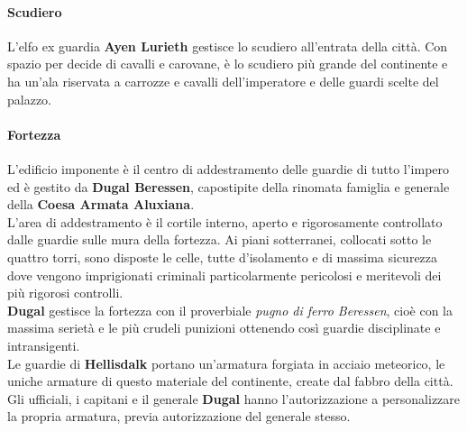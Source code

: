\documentclass[10pt,twoside,onecolumn,openany]{book}
\begin{document}
\paragraph{Scudiero}
L'elfo ex guardia \textbf{Ayen Lurieth} gestisce lo scudiero all'entrata della città. Con spazio per decide di cavalli e carovane, è lo scudiero più grande del continente e ha un'ala riservata a carrozze e cavalli dell'imperatore e delle guardi scelte del palazzo.
\paragraph{Fortezza}
L'edificio imponente è il centro di addestramento delle guardie di tutto l'impero ed è gestito da \textbf{Dugal Beressen}, capostipite della rinomata famiglia e generale della \textbf{Coesa Armata Aluxiana}.\\
L'area di addestramento è il cortile interno, aperto e rigorosamente controllato dalle guardie sulle mura della fortezza. Ai piani sotterranei, collocati sotto le quattro torri, sono disposte le celle, tutte d'isolamento e di massima sicurezza dove vengono imprigionati criminali particolarmente pericolosi e meritevoli dei più rigorosi controlli.\\
\textbf{Dugal} gestisce la fortezza con il proverbiale \textit{pugno di ferro Beressen}, cioè con la massima serietà e le più crudeli punizioni ottenendo così guardie disciplinate e intransigenti.\\
Le guardie di \textbf{Hellisdalk} portano un'armatura forgiata in acciaio meteorico, le uniche armature di questo materiale del continente, create dal fabbro della città. Gli ufficiali, i capitani e il generale \textbf{Dugal} hanno l'autorizzazione a personalizzare la propria armatura, previa autorizzazione del generale stesso.
\end{document}
